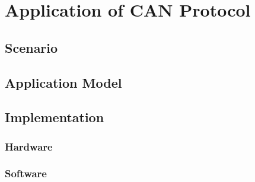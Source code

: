 
\section{Application of CAN Protocol}
\subsection{Scenario}
\subsection{Application Model}
\subsection{Implementation}
\subsubsection{Hardware}
\subsubsection{Software}